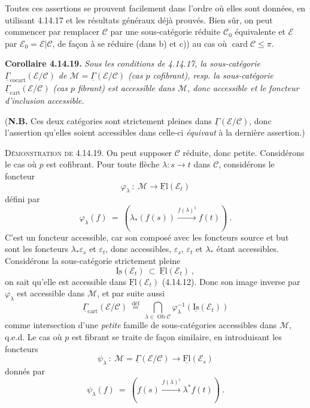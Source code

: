 \documentclass[11pt]{article}
\newcommand{\printedpage}[1]{\marginpar{\footnotesize p.~#1}}
\newcommand{\msp}[1]{\marginpar{\footnotesize [#1]}}
\newcommand{\Ob}{\operatorname{Ob}}
\newcommand{\Fl}{\operatorname{Fl}}
\newcommand{\uFl}{\underline{\mathrm{Fl}}}
\newcommand{\uIs}{\underline{\mathrm{Is}}}
\newcommand{\uGamma}{\underline{\Gamma}}
\newcommand{\cocart}{\mathrm{cocart}}
\newcommand{\cart}{\mathrm{cart}}
\begin{document}
\printedpage{149}

\msp{page 393}
Toutes ces assertions se prouvent facilement dans l’ordre où elles sont données, en utilisant 4.14.17 et les résultats généraux déjà prouvés. Bien sûr, on peut commencer par remplacer $\mathcal{C}$ par une sous-catégorie réduite $\mathcal{C}_0$ équivalente et $\mathcal{E}$ par $\mathcal{E}_0 = \mathcal{E}|\mathcal{C}$, de façon à se réduire (dans b) et c)) au cas où $\operatorname{card}\mathcal{C} \leqslant \pi$.

\textbf{Corollaire 4.14.19.} \textit{Sous les conditions de 4.14.17, la sous-catégorie $\uGamma_{\cocart}(\mathcal{E}/\mathcal{C})$ de $\mathcal{M} = \uGamma(\mathcal{E}/\mathcal{C})$ (cas $p$ cofibrant), resp. la sous-catégorie $\uGamma_{\cart}(\mathcal{E}/\mathcal{C})$ (cas $p$ fibrant) est accessible dans $\mathcal{M}$, donc accessible et le foncteur d’inclusion} \textit{accessible.}

(\textbf{N.B.} Ces deux catégories sont strictement pleines dans $\uGamma(\mathcal{E}/\mathcal{C})$, donc l’assertion qu’elles soient accessibles dans celle-ci \textit{équivaut} à la dernière assertion.)

\textsc{Démonstration de} 4.14.19. On peut supposer $\mathcal{C}$ réduite, donc petite. Considérons le cas où $p$ est cofibrant. Pour toute flèche $\lambda : s \longrightarrow t$ dans $\mathcal{C}$, considérons le foncteur
\[
\varphi_\lambda \ : \ \mathcal{M} \longrightarrow \uFl(\mathcal{E}_t)
\]
défini par
\msp{page 394}
\[
\varphi_\lambda(f) \ = \ (\lambda_*(f(s)) \xrightarrow{f(\lambda)^\natural} f(t)) \ .
\]
C’est un foncteur accessible, car son composé avec les foncteurs source et but sont les foncteurs $\lambda_*\varepsilon_s$ et $\varepsilon_t$, donc accessibles, $\varepsilon_s$, $\varepsilon_t$ et $\lambda_*$ étant accessibles. Considérons la sous-catégorie strictement pleine
\[
\uIs(\mathcal{E}_t) \ \subset \ \uFl(\mathcal{E}_t) \ ,
\]
on sait qu’elle est accessible dans $\uFl(\mathcal{E}_t)$ (4.14.12). Donc son image inverse par $\varphi_\lambda$ est accessible dans $\mathcal{M}$, et par suite aussi
\[
\uGamma_{\cart}(\mathcal{E}/\mathcal{C}) \ \overset{\text{déf}}{=} \ \bigcap_{\lambda\in\Ob\mathcal{C}} \varphi_\lambda^{-1}(\uIs(\mathcal{E}_t))
\]
comme intersection d’une \textit{petite} famille de sous-catégories accessibles dans $\mathcal{M}$, q.e.d. Le cas où $p$ est fibrant se traite de façon similaire, en introduisant les foncteurs
\[
\psi_\lambda \ : \ \mathcal{M} = \uGamma(\mathcal{E}/\mathcal{C}) \longrightarrow \uFl(\mathcal{E}_s)
\]
donnés par
\[
\psi_\lambda(f) \ = \ (f(s) \xrightarrow{f(\lambda)^\flat} \lambda^* f(t)) \ .
\]
\end{document}
